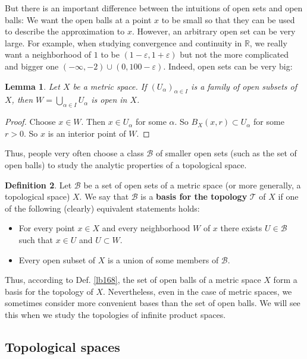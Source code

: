 \documentclass[12pt,b5paper,notitlepage]{article}
\theoremstyle{definition}
\newtheorem{df}{Definition}[section]
\theoremstyle{plain}
\newtheorem{lm}[df]{Lemma}
\newcommand{\mc}{\mathcal}
\newcommand{\Rbb}{\mathbb R}
\newcommand{\eps}{\varepsilon}
\numberwithin{equation}{section}
\begin{document}
But there is an important difference between the intuitions of open sets and open balls: We want the open balls at a point $x$ to be small so that they can be used to describe the approximation to $x$. However, an arbitrary open set can be very large. For example, when studying convergence and continuity in $\Rbb$, we really want a neighborhood of $1$ to be $(1-\eps,1+\eps)$ but not the more complicated and bigger one $(-\infty,-2)\cup (0,100-\eps)$. Indeed, open sets can be very big:


\begin{lm}
Let $X$ be a metric space. If $(U_\alpha)_{\alpha\in I}$ is a family of open subsets of $X$, then $W=\bigcup_{\alpha\in I}U_\alpha$ is open in $X$.
\end{lm}

\begin{proof}
Choose $x\in W$. Then $x\in U_\alpha$ for some $\alpha$. So $B_X(x,r)\subset U_\alpha$ for some $r>0$. So $x$ is an interior point of $W$.
\end{proof}



Thus, people very often choose a class $\mc B$ of smaller open sets (such as the set of open balls) to study the analytic properties of a topological space. 
\begin{df}\label{lb170}
Let $\mc B$ be a set of open sets of a metric space (or more generally, a topological space) $X$. We say that $\mc B$ is a \textbf{basis for the topology}  $\mc T$ of $X$ if one of the following (clearly) equivalent statements holds:
\begin{itemize}
\item For every point $x\in X$ and every neighborhood $W$ of $x$ there exists $U\in\mc B$ such that $x\in U$ and $U\subset W$.
\item Every open subset of $X$ is a union of some members of $\mc B$.
\end{itemize}
\end{df}

Thus, according to Def. \ref{lb168}, the set of open balls of a metric space $X$ form a basis for the topology of $X$. Nevertheless, even in the case of metric spaces, we sometimes consider more convenient bases than the set of open balls. We will see this when we study the topologies of infinite product spaces.


\subsection{Topological spaces}
\end{document}
